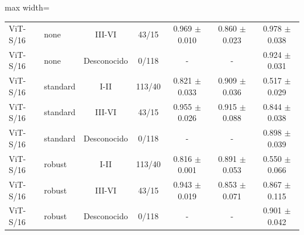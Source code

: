 \begin{table}[t]
\begin{adjustbox}{max width=\linewidth}
\begin{tabular}{llccccc}
ViT-S/16 & none & III-VI & 43/15 & 0.969 $\pm$ 0.010 & 0.860 $\pm$ 0.023 & 0.978 $\pm$ 0.038 \\
ViT-S/16 & none & Desconocido & 0/118 & - & - & 0.924 $\pm$ 0.031 \\
ViT-S/16 & standard & I-II & 113/40 & 0.821 $\pm$ 0.033 & 0.909 $\pm$ 0.036 & 0.517 $\pm$ 0.029 \\
ViT-S/16 & standard & III-VI & 43/15 & 0.955 $\pm$ 0.026 & 0.915 $\pm$ 0.088 & 0.844 $\pm$ 0.038 \\
ViT-S/16 & standard & Desconocido & 0/118 & - & - & 0.898 $\pm$ 0.039 \\
ViT-S/16 & robust & I-II & 113/40 & 0.816 $\pm$ 0.001 & 0.891 $\pm$ 0.053 & 0.550 $\pm$ 0.066 \\
ViT-S/16 & robust & III-VI & 43/15 & 0.943 $\pm$ 0.019 & 0.853 $\pm$ 0.071 & 0.867 $\pm$ 0.115 \\
ViT-S/16 & robust & Desconocido & 0/118 & - & - & 0.901 $\pm$ 0.042 \\
\bottomrule
\end{tabular}
\end{adjustbox}
\end{table}
